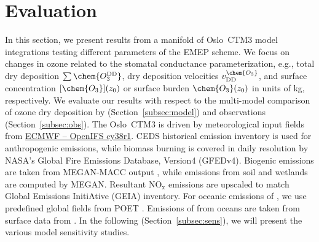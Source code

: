 \documentclass[gmd, manuscript]{copernicus}
\begin{document}
\section{Evaluation}
\label{sec:eval}
In this section, we present results from a manifold of Oslo~CTM3 model integrations testing different parameters of the EMEP scheme. We focus on changes in ozone related to the stomatal conductance parameterization, e.g., total dry deposition $\sum\chem{O_3^\text{DD}}$, dry deposition velocities $v^\chem{O_3}_\text{DD}$, and surface concentration $[\chem{O_3}](z_0)$ or surface burden $\chem{O_3}(z_0)$ in units of \unit{kg}, respectively. We evaluate our results with respect to the multi-model comparison of ozone dry deposition by \citet{ACP:Hardacre2015} (Section~\ref{subsec:model}) and observations (Section~\ref{subsec:obs}). The Oslo~CTM3 is driven by meteorological input fields from \href{https://www.ecmwf.int/en/forecasts/documentation-and-support/evolution-ifs/cycle-38r1-summary-changes}{ECMWF -- OpenIFS cy38r1}. CEDS historical emission inventory is used for anthropogenic emissions, while biomass burning is covered in daily resolution by NASA's Global Fire Emissions Database, Version4 (GFEDv4). Biogenic emissions are taken from MEGAN-MACC output \citep{ACP:Sindelarova2014}, while emissions from soil and wetlands are computed by MEGAN. Resultant $\mathrm{NO_x}$ emissions are upscaled to match Global Emissions InitiAtive (GEIA) inventory. For oceanic emissions of , we use predefined global fields from POET \citep{POET}. Emissions of  from oceans are taken from surface data from \citet{HYMN}. In the following (Section~\ref{subsec:sens}), we will present the various model sensitivity studies.
\end{document}
